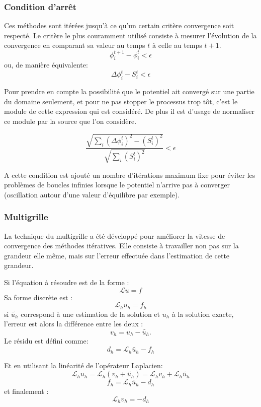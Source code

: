 \subsubsection{Condition d'arrêt}
Ces méthodes sont itérées jusqu'à ce qu'un certain critère convergence soit respecté. 
Le critère le plus couramment utilisé consiste à mesurer l'évolution de la convergence en comparant sa valeur au temps $t$ à celle au temps $t+1$.
\[ \phi^{t+1}_i - \phi^{t}_i < \epsilon \]
ou, de manière équivalente:
\[ \Delta \phi_i^t - S_i^t< \epsilon \]

Pour prendre en compte la possibilité que le potentiel ait convergé sur une partie du domaine seulement, et pour ne pas stopper le processus trop tôt, c'est le module de cette expression qui est considéré. 
De plus il est d'usage de normaliser ce module par la source que l'on considère.

\[\dfrac{ \sqrt{  \sum_i \left (  \Delta \phi_i^t \right )^2 - \left (S^t_i  \right )^2 } }{\sqrt{  \sum_i  \left (S^t_i  \right )^2 } } < \epsilon \]

A cette condition est ajouté un nombre d'itérations maximum fixe pour éviter les problèmes de boucles infinies lorsque le potentiel n'arrive pas à converger (oscillation autour d'une valeur d'équilibre par exemple).

\subsubsection{Multigrille}

La technique du multigrille a été développé pour améliorer la vitesse de convergence des méthodes itératives.
Elle consiste à travailler non pas sur la grandeur elle même, mais sur l'erreur effectuée dans l'estimation de cette grandeur.
 
Si l'équation à résoudre est de la forme : 
\[ \mathcal{L} u = f \]
Sa forme discrète est :
\[ \mathcal{L}_h u_h = f_h \]
si $\tilde{u_h}$ correspond à une estimation de la solution et $u_h$ à la solution exacte, l'erreur est alors la différence entre les deux : 
\[ v_h = u_h - \tilde{u_h}. \]
Le résidu est défini comme:
\[ d_h = \mathcal{L}_h \tilde{u_h} - f_h \]

Et en utilisant la linéarité de l'opérateur Laplacien:
\[ \mathcal{L}_h u_h = \mathcal{L}_h (v_h + \tilde{u_h} ) = \mathcal{L}_h v_h +\mathcal{L}_h \tilde{u_h} \]
\[ f_h   = \mathcal{L}_h \tilde{u_h} - d_h\]
et finalement :
\[ \mathcal{L}_h v_h = -d_h \]

